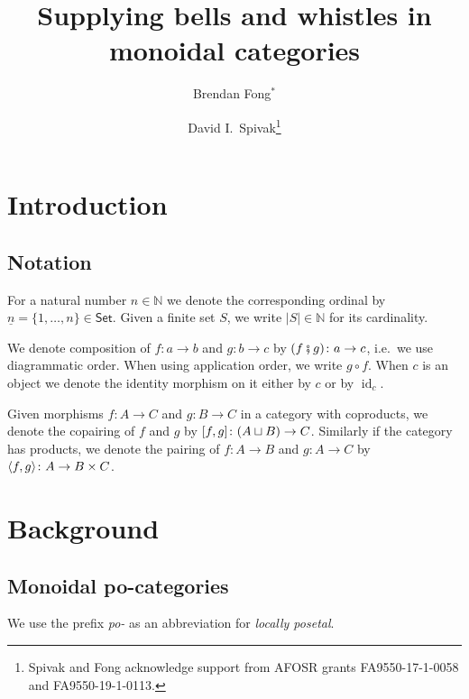 \documentclass[11pt, oneside, article]{memoir}
\theoremstyle{plain}
\theoremstyle{definition}
\theoremstyle{remark}
\newcommand{\ord}[1]{\underline{#1}}%
\newcommand{\Cat}[1]{{\mathsf{#1}}}%
\DeclareMathOperator{\id}{id}
\DeclarePairedDelimiter{\pair}{\langle}{\rangle}
\DeclarePairedDelimiter{\copair}{[}{]}
\newcommand{\smset}{\Cat{Set}}
\newcommand{\nn}{\mathbb{N}}
\newcommand{\cp}{\mathbin{\fatsemi}}
\begin{document}
   

\title{Supplying bells and whistles in monoidal categories}
\author{Brendan Fong$^*$ \and David I.\ Spivak\thanks{Spivak and Fong acknowledge support from AFOSR grants FA9550-17-1-0058 and FA9550-19-1-0113.}}
  
\maketitle

\tableofcontents*

\chapter{Introduction}

\section{Notation}\label{sec.notation}
For a natural number $n\in\nn$ we denote the corresponding ordinal by $\ord{n}=\{1,\ldots,n\}\in\smset$. Given a finite set $S$, we write $|S|\in\nn$ for its cardinality.

We denote composition of $f\colon a\to b$ and $g\colon b\to c$ by $(f\cp g)\colon a\to c$, i.e.\ we use diagrammatic order. When using application order, we write $g\circ f$. When $c$ is an object we denote the identity morphism on it either by $c$ or by $\id_c$.

Given morphisms $f\colon A\to C$ and $g\colon B\to C$ in a category with coproducts, we denote the copairing of $f$ and $g$ by $\copair{f,g}\colon(A\sqcup B)\to C$. Similarly if the category has products, we denote the pairing of $f\colon A\to B$ and $g\colon A\to C$ by $\pair{f,g}\colon A\to B\times C$.

\chapter{Background}

\section{Monoidal po-categories}

We use the prefix \emph{po-} as an abbreviation for \emph{locally posetal}.
\end{document}
